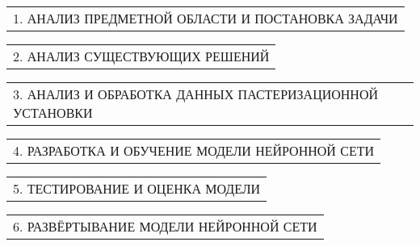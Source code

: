 \documentclass[12pt, А4, twoside]{article}
\begin{document}
\begin{FlushLeft}
    \vspace{-0.1 cm}

    \begin{tabular}{p{17.25cm}}
        \hspace{0.3cm} \textsf{1. АНАЛИЗ ПРЕДМЕТНОЙ ОБЛАСТИ И ПОСТАНОВКА ЗАДАЧИ} \vspace{0pt} \hline \\
    \end{tabular}

    \vspace{-0.1 cm}

    \begin{tabular}{p{17.25cm}}
        \hspace{0.3cm} \textsf{2. АНАЛИЗ СУЩЕСТВУЮЩИХ РЕШЕНИЙ} \vspace{0pt} \hline \\
    \end{tabular}

    \vspace{-0.1 cm}

    \begin{tabular}{p{17.25cm}}
        \hspace{0.3cm} \textsf{3. АНАЛИЗ И ОБРАБОТКА ДАННЫХ ПАСТЕРИЗАЦИОННОЙ УСТАНОВКИ} \vspace{0pt} \hline \\
    \end{tabular}

    \vspace{-0.1 cm}

    \begin{tabular}{p{17.25cm}}
        \hspace{0.3cm} \textsf{4. РАЗРАБОТКА И ОБУЧЕНИЕ МОДЕЛИ НЕЙРОННОЙ СЕТИ} \vspace{0pt} \hline \\
    \end{tabular}

    \vspace{-0.1 cm}

    \begin{tabular}{p{17.25cm}}
        \hspace{0.3cm} \textsf{5. ТЕСТИРОВАНИЕ И ОЦЕНКА МОДЕЛИ} \vspace{0pt} \hline \\
    \end{tabular}

    \vspace{-0.1 cm}

    \begin{tabular}{p{17.25cm}}
        \hspace{0.3cm} \textsf{6. РАЗВЁРТЫВАНИЕ МОДЕЛИ НЕЙРОННОЙ СЕТИ} \vspace{0pt} \hline \\
    \end{tabular}


\end{FlushLeft}
\end{document}
